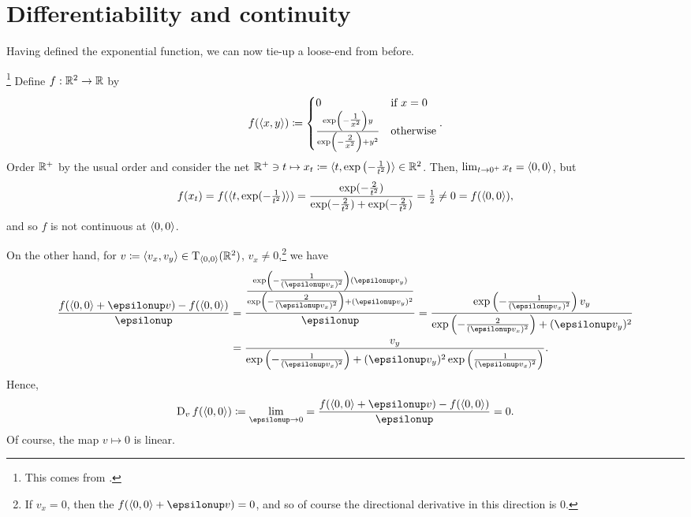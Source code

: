\section{Differentiability and continuity}

Having defined the exponential function, we can now tie-up a loose-end from before.
\begin{exm}\footnote{This comes from \cite[pg.~116]{Gelbaum}.}\label{exm6.2.15}
Define $f:\R ^2\rightarrow \R$ by
\begin{equation}
f(\coord{x,y})\coloneqq \begin{cases}0 & \text{if }x=0 \\ \frac{\exp \left( -\tfrac{1}{x^2}\right) y}{\exp \left( -\tfrac{2}{x^2}\right) +y^2} & \text{otherwise}\end{cases}.
\end{equation}
Order $\R ^+$ by the usual order and consider the net $\R ^+\ni t\mapsto x_t\coloneqq \coord{t,\exp \left( -\frac{1}{t^2}\right) }\in \R ^2$.  Then, $\lim _{t\to 0^+}x_t=\coord{0,0}$, but
\begin{equation}
f(x_t)=f(\coord{t,\exp (-\tfrac{1}{t^2})})=\frac{\exp (-\tfrac{2}{t^2})}{\exp (-\tfrac{2}{t^2})+\exp (-\tfrac{2}{t^2})}=\tfrac{1}{2}\neq 0=f(\coord{0,0}),
\end{equation}
and so $f$ is not continuous at $\coord{0,0}$.

On the other hand, for $v\coloneqq \coord{v_x,v_y}\in \tangent{\R ^2}{\coord{0,0}}$, $v_x\neq 0$,\footnote{If $v_x=0$, then the $f(\coord{0,0}+\epsilon v)=0$, and so of course the directional derivative in this direction is $0$.} we have
\begin{equation}
\begin{split}
\frac{f(\coord{0,0}+\epsilon v)-f(\coord{0,0})}{\epsilon} & =\frac{\frac{\exp \left( -\tfrac{1}{(\epsilon v_x)^2}\right) (\epsilon v_y)}{\exp \left(-\tfrac{2}{(\epsilon v_x)^2}\right) +(\epsilon v_y)^2}}{\epsilon}=\frac{\exp \left( -\tfrac{1}{(\epsilon v_x)^2}\right) v_y}{\exp \left( -\tfrac{2}{(\epsilon v_x)^2}\right) +(\epsilon v_y)^2} \\
& =\frac{v_y}{\exp \left( -\tfrac{1}{(\epsilon v_x)^2}\right) +(\epsilon v_y)^2\exp \left( \tfrac{1}{(\epsilon v_x)^2}\right) }.
\end{split}
\end{equation}
Hence,
\begin{equation}
\D _vf(\coord{0,0})\coloneqq \lim _{\epsilon \to 0}=\frac{f(\coord{0,0}+\epsilon v)-f(\coord{0,0})}{\epsilon}=0.
\end{equation}
Of course, the map $v\mapsto 0$ is linear.


\end{exm}
